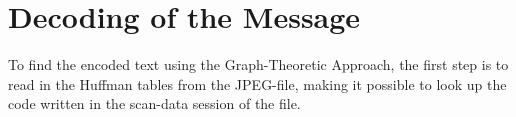 \section{Decoding of the Message}
To find the encoded text using the Graph-Theoretic Approach, the first step is to read in the Huffman tables from the JPEG-file, making it possible to look up the code written in the scan-data session of the file. 

